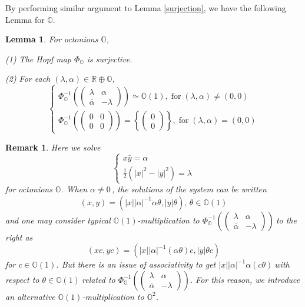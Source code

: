 \documentclass[a4paper]{article}%
\newtheorem{lemma}[theorem]{Lemma}
\newtheorem{remark}[theorem]{Remark}
\begin{document}
By performing similar argument to Lemma \ref{surjection}, we have the
following Lemma for $\mathbb{O}$.

\begin{lemma}
\label{SurjectivOctonions}For octonions $\mathbb{O}$,

(1) The Hopf map $\Phi_{\mathbb{O}}$ is surjective.

(2) For each $(\lambda,\alpha)\in\mathbb{R}\oplus\mathbb{O}$,
\[%
\begin{cases}
\Phi_{\mathbb{O}}^{-1}\left(
\begin{pmatrix}
\lambda & \alpha\\
\overline{\alpha} & -\lambda
\end{pmatrix}
\right)  \simeq\mathbb{O}(1),\;\text{for}\;(\lambda,\alpha)\neq(0,0)\\
\Phi_{\mathbb{O}}^{-1}\left(
\begin{pmatrix}
0 & 0\\
0 & 0
\end{pmatrix}
\right)  =\left\{
\begin{pmatrix}
0\\
0
\end{pmatrix}
\right\}  ,\;\text{for}\;(\lambda,\alpha)=(0,0)
\end{cases}
\]

\end{lemma}

\begin{remark}
Here we solve%
\[%
\begin{cases}
x\bar{y}=\alpha\\
\frac{1}{2}(\left\vert x\right\vert ^{2}-\left\vert y\right\vert ^{2})=\lambda
\end{cases}
\]
for octonions $\mathbb{O}$. When $\alpha\neq0\,$, the solutions of the system
can be written
\[
(x,y)=(\left\vert x\right\vert \left\vert \alpha\right\vert ^{-1}\alpha
\theta,\left\vert y\right\vert \theta)\text{,\ }\theta\in\mathbb{O}(1)
\]
and one may consider typical $\mathbb{O}(1)$-multiplication to $\Phi
_{\mathbb{O}}^{-1}\left(
\begin{pmatrix}
\lambda & \alpha\\
\overline{\alpha} & -\lambda
\end{pmatrix}
\right)  \ $to the right as
\[
(xc,yc)=(\left\vert x\right\vert \left\vert \alpha\right\vert ^{-1}\left(
\alpha\theta\right)  c,\left\vert y\right\vert \theta c)
\]
for $c\in\mathbb{O}(1)$. But there is an issue of associativity to get
$\left\vert x\right\vert \left\vert \alpha\right\vert ^{-1}\alpha\left(
c\theta\right)  \ $with respect to $\theta\in\mathbb{O}(1)\ $related to
$\Phi_{\mathbb{O}}^{-1}\left(
\begin{pmatrix}
\lambda & \alpha\\
\overline{\alpha} & -\lambda
\end{pmatrix}
\right)  $. For this reason, we introduce an alternative $\mathbb{O}%
(1)$-multiplication to $\mathbb{O}^{2}$.
\end{remark}
\end{document}
